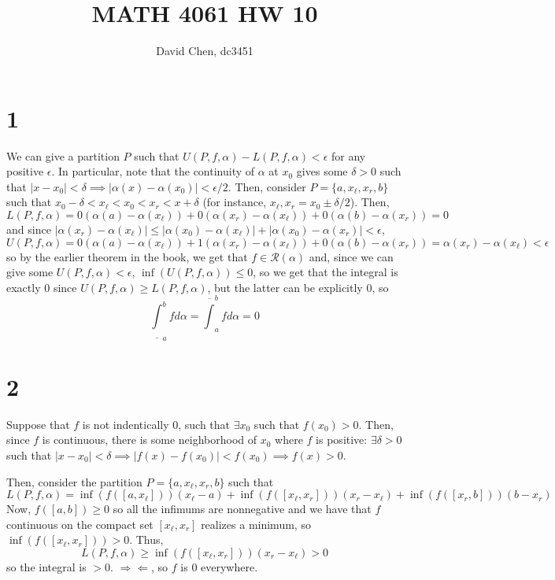 \documentclass[12pt,letterpaper]{article}
\title{MATH 4061 HW 10}
\author{David Chen, dc3451}
\theoremstyle{definition}
\newcommand{\contra}{\Rightarrow\!\Leftarrow}
\begin{document}
\maketitle

\section*{1}

We can give a partition $P$ such that $U(P, f, \alpha) - L(P, f, \alpha) < \epsilon$ for any positive $\epsilon$. In particular, note that the continuity of $\alpha$ at $x_{0}$ gives some $\delta > 0$ such that $|x - x_{0}| < \delta \implies |\alpha(x) - \alpha(x_{0})| < \epsilon/2$. Then, consider $P = \{a, x_{\ell}, x_{r}, b\}$ such that $x_{0} - \delta < x_{\ell} < x_{0} < x_{r} < x + \delta$ (for instance, $x_{\ell}, x_{r} = x_{0} \pm \delta/2$). Then,
\[
  L(P, f, \alpha) = 0(\alpha(a) - \alpha(x_{\ell})) + 0(\alpha(x_{r}) - \alpha(x_{\ell})) + 0(\alpha(b) - \alpha(x_{r})) = 0
\]
and since $|\alpha(x_{r}) - \alpha(x_{\ell})| \leq |\alpha(x_{0}) - \alpha(x_{\ell})| + |\alpha(x_{0}) - \alpha(x_{r})| < \epsilon$,
\[
  U(P, f, \alpha) = 0(\alpha(a) - \alpha(x_{\ell})) + 1(\alpha(x_{r}) - \alpha(x_{\ell})) + 0(\alpha(b) - \alpha(x_{r})) = \alpha(x_{r}) - \alpha(x_{\ell}) < \epsilon
\]
so by the earlier theorem in the book, we get that $f \in \mathscr{R}(\alpha)$ and, since we can give some $U(P, f, \alpha) < \epsilon$, $\inf(U(P, f, \alpha)) \leq 0$, so we get that the integral is exactly $0$ since $U(P, f, \alpha) \geq L(P, f, \alpha)$, but the latter can be explicitly $0$, so
\[
  \underline{\int}_{a}^{b}fd\alpha = \overline{\int}_{a}^{b}fd\alpha = 0
\]

\section*{2}

Suppose that $f$ is not indentically $0$, such that $\exists x_{0}$ such that $f(x_{0}) > 0$. Then, since $f$ is continuous, there is some neighborhood of $x_{0}$ where $f$ is positive: $\exists \delta > 0$ such that $|x - x_{0}| < \delta \implies |f(x) - f(x_{0})| < f(x_{0}) \implies f(x) > 0$.

Then, consider the partition $P = \{a, x_{\ell}, x_{r}, b\}$ such that
\[
  L(P, f, \alpha) = \inf(f([a,x_{\ell}]))(x_{\ell} - a) + \inf(f([x_{\ell},x_{r}]))(x_{r} - x_{\ell}) + \inf(f([x_{r}, b]))(b - x_{r})
\]
Now, $f([a,b]) \geq 0$ so all the infimums are nonnegative and we have that $f$ continuous on the compact set $[x_{\ell}, x_{r}]$ realizes a minimum, so $\inf(f([x_{\ell}, x_{r}])) > 0$. Thus,
\[
  L(P, f, \alpha) \geq   \inf(f([x_{\ell},x_{r}]))(x_{r} - x_{\ell}) > 0
\]
so the integral is $> 0$. $\contra$, so $f$ is $0$ everywhere.
\end{document}
